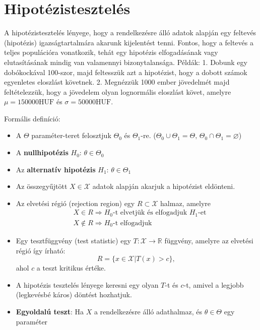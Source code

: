 \documentclass[12pt]{article}
\theoremstyle{plain}
\begin{document}
\section{Hipotézistesztelés}
A hipotézistesztelés lényege, hogy a rendelkezésre álló adatok alapján egy feltevés (hipotézis) igazságtartalmára akarunk
kijelentést tenni. Fontos, hogy a feltevés a teljes populációra vonatkozik, tehát egy hipotézis elfogadásának vagy elutasításának
mindig van valamennyi bizonytalansága. Példák: 1. Dobunk egy dobókockával 100-szor, majd feltesszük azt a hipotézist, hogy 
a dobott számok egyenletes eloszlást követnek. 2. Megnézzük 1000 ember jövedelmét majd feltételezzük, hogy a jövedelem olyan
lognormális eloszlást követ, amelyre $\mu=150000\text{HUF}$ és $\sigma=50000\text{HUF}$.
\par Formális definíció:
\begin{itemize}
    \item A $\Theta$ paraméter-teret felosztjuk $\Theta_0$ és $\Theta_1$-re. ($\Theta_0\cup\Theta_1=\Theta,\, \Theta_0\cap\Theta_1=\varnothing$)
    \item A \textbf{nullhipotézis}  $H_0:\, \theta\in\Theta_0$
    \item Az \textbf{alternatív hipotézis}  $H_1:\, \theta\in\Theta_1$
    \item Az összegyűjtött $X\in\mathcal X$ adatok alapján akarjuk a hipotézist eldönteni.
    \item Az elvetési régió (rejection region) egy $R\subset \mathcal X$ halmaz, amelyre
        \begin{align*}
            & X\in R \Rightarrow \text{$H_0$-t elvetjük és elfogadjuk $H_1$-et} \\
            & X\notin R \Rightarrow \text{$H_0$-t elfogadjuk}
        \end{align*}
    \item Egy tesztfüggvény (test statistic) egy $T: \mathcal X \rightarrow \mathbb R$ függvény, amelyre az elvetési
    régió így írható: 
        \begin{equation*}
            R = \{x \in \mathcal X | T(x) > c \} \text{, }
        \end{equation*}
    ahol $c$ a teszt kritikus értéke.
    \item A hipotézis tesztelés lényege keresni egy olyan $T$-t és $c$-t, amivel a legjobb (legkevésbé káros) döntést
    hozhatjuk.
    \item \textbf{Egyoldalú teszt}: Ha $X$ a rendelkezésre álló adathalmaz, és $\theta\in \Theta$ egy paraméter 

\end{itemize}
\end{document}
